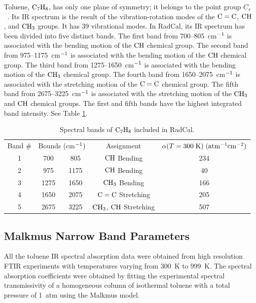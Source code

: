 Toluene, $\rm C_7H_8$, has only one plane of symmetry; it belongs to the point group $C_{s}$~\cite{Herzberg1949}. Its IR spectrum is the result of the vibration-rotation modes of the $\rm C=C$, $\rm CH$, and $\rm CH_3$ groups. It has 39 vibrational modes. In RadCal, its IR spectrum has been divided into five distinct bands. The first band from 700--805~cm$\rm^{-1}$ is associated with the bending motion of the $\rm CH$ chemical group. The second band from 975--1175~cm$\rm^{-1}$ is associated with the bending motion of the $\rm CH$ chemical group. The third band from 1275--1650~cm$\rm^{-1}$ is associated with the bending motion of the $\rm CH_3$ chemical group. The fourth band from 1650--2075~cm$\rm^{-1}$ is associated with the stretching motion of the $\rm C=C$ chemical group. The fifth band from 2675--3225~cm$\rm^{-1}$ is associated with the stretching motion of the $\rm CH_3$ and $\rm CH$ chemical groups. The first and fifth bands have the highest integrated band intensity. See Table \ref{Table::C7H8}.
\begin{table}[ht]
   \centering
   \caption{Spectral bands of $\rm C_7H_8$ included in RadCal.}
   \vspace{0.1in}
   \label{Table::C7H8}
   \begin{tabular}{|c|c|c|c|c|}
    \hline
    Band \# & \multicolumn{2}{|l|}{Bounds (cm$\rm ^{-1}$) } & Assignment & $\alpha(T=300 \; {\rm K}) \; (\rm {atm^{-1} cm^{-2}})$\\
    \cline{1-5}
    1 & 700  & 805  &  $\rm CH$ Bending      & 234 \\
    2 & 975  & 1175 &  $\rm CH$ Bending      & 40  \\
    3 & 1275 & 1650 &  $\rm CH_3$ Bending    & 166 \\
    4 & 1650 & 2075 &  $\rm C=C$ Stretching  & 205 \\
    5 & 2675 & 3225 &  $\rm CH_3$, $\rm CH$  Stretching & 507  \\
    \hline
   \end{tabular}
\end{table}

\subsection{Malkmus Narrow Band Parameters}

All the toluene IR spectral absorption data were obtained from high resolution FTIR experiments with temperatures varying from 300~K to 999~K. The spectral absorption coefficients were obtained by fitting the experimental spectral transmissivity of a homogeneous column of isothermal toluene with a total pressure of 1~atm using the Malkmus model.

